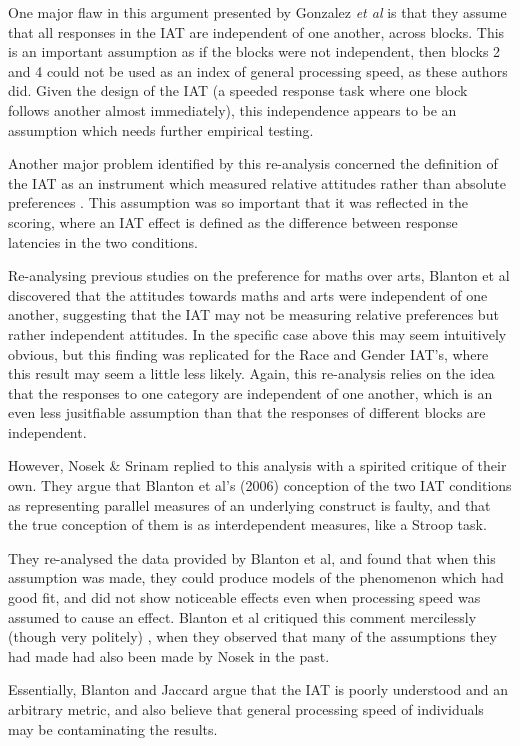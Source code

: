 One major flaw in this argument presented by Gonzalez \textit{et al}  is that they assume that all responses in the IAT are independent of one another, across blocks. This is an important assumption as if the blocks were not independent, then blocks 2 and 4 could not be used as an index of general processing speed, as these authors did. Given the design of the IAT (a speeded response task where one block follows another almost immediately), this independence appears to be an assumption which needs further empirical testing. 

Another major problem identified by this re-analysis concerned the definition of the IAT as an instrument which measured relative attitudes rather than absolute preferences \cite{Greenwald1998} . This assumption was so important that it was reflected in the scoring, where an IAT effect is defined as the difference between response latencies in the two conditions. 

Re-analysing previous studies on the preference for maths over arts, Blanton et al discovered that the attitudes towards maths and arts were independent of one another, suggesting that the IAT may not be measuring relative preferences but rather independent attitudes. In the specific case above this may seem intuitively obvious, but this finding was replicated for the Race and Gender IAT's, where this result may seem a little less likely. Again, this re-analysis relies on the idea that the responses to one category are independent of one another, which is an even less jusitfiable assumption than that the responses of different blocks are independent. 

However, Nosek \& Srinam \cite{Nosek2007} replied to this analysis with a spirited critique of their own. They argue that Blanton et al's (2006) conception of the two IAT conditions as representing parallel measures of an underlying construct is faulty, and that the true conception of them is as interdependent measures, like a Stroop task. 

They re-analysed the data provided by Blanton et al, and found that when this assumption was made, they could produce models of the phenomenon which had good fit, and did not show noticeable effects even when processing speed was assumed to cause an effect. Blanton et al critiqued this comment mercilessly (though very politely) \cite{Blanton2007}, when they observed that many of the assumptions they had made had also been made by Nosek in the past. 

Essentially, Blanton and Jaccard argue that the IAT is poorly understood and an arbitrary metric, and also believe that general processing speed of individuals may be contaminating the results. 


